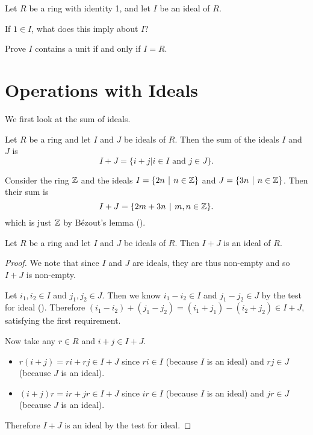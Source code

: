 \begin{exercise}\label{exercise-ideal-contains-unit-iff-ideal-is-whole-ring}
    Let $R$ be a ring with identity 1, and let $I$ be an ideal of $R$.
    \begin{partquestions}{\roman*}
        \item If $1 \in I$, what does this imply about $I$?
        \item Prove $I$ contains a unit if and only if $I = R$.
    \end{partquestions}
\end{exercise}

\section{Operations with Ideals}
We first look at the sum of ideals.

\begin{definition}
    Let $R$ be a ring and let $I$ and $J$ be ideals of $R$. Then the sum of the ideals $I$ and $J$ is
    \[
        I + J = \{i + j \vert i\in I \text{ and } j\in J\}.
    \]
\end{definition}

\begin{example}
    Consider the ring $\mathbb{Z}$ and the ideals $I = \{2n \vert n \in \Z\}$ and $J = \{3n \vert n \in \Z\}$. Then their sum is
    \[
        I + J = \{2m + 3n \vert m,n \in \Z\}.
    \]
    which is just $\mathbb{Z}$ by B\'ezout's lemma ().
\end{example}

\begin{proposition}\label{prop-sum-of-ideals-is-ideal}
    Let $R$ be a ring and let $I$ and $J$ be ideals of $R$. Then $I + J$ is an ideal of $R$.
\end{proposition}
\begin{proof}
    We note that since $I$ and $J$ are ideals, they are thus non-empty and so $I+J$ is non-empty.

    Let $i_1, i_2 \in I$ and $j_1, j_2 \in J$. Then we know $i_1 - i_2 \in I$ and $j_1 - j_2 \in J$ by the test for ideal (). Therefore $(i_1 - i_2) + (j_1 - j_2) = (i_1 + j_1) - (i_2 + j_2) \in I + J$, satisfying the first requirement.

    Now take any $r \in R$ and $i+j \in I+J$.
    \begin{itemize}
        \item $r(i+j) = ri + rj \in I+J$ since $ri \in I$ (because $I$ is an ideal) and $rj \in J$ (because $J$ is an ideal).
        \item $(i+j)r = ir + jr \in I+J$ since $ir \in I$ (because $I$ is an ideal) and $jr \in J$ (because $J$ is an ideal).
    \end{itemize}
    Therefore $I + J$ is an ideal by the test for ideal.
\end{proof}

